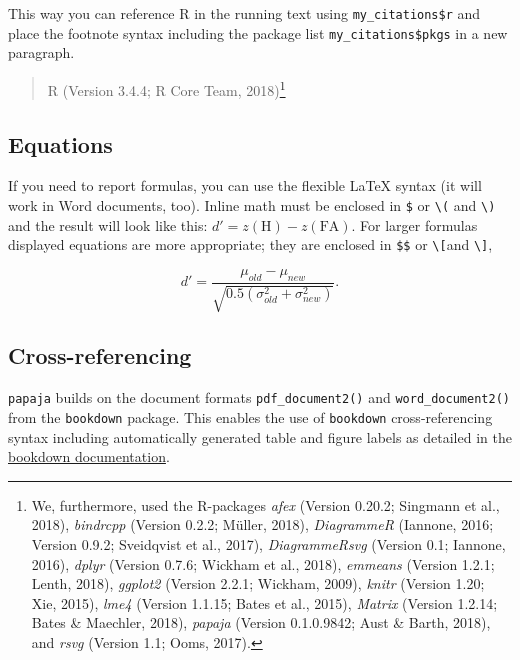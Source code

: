 \documentclass[man,floatsintext]{apa6}
\let\rmarkdownfootnote\footnote%
\def\footnote{\protect\rmarkdownfootnote}
\theoremstyle{definition}
\theoremstyle{definition}
\theoremstyle{definition}
\theoremstyle{remark}
\begin{document}
This way you can reference R in the running text using
\texttt{my\_citations\$r} and place the footnote syntax including the
package list \texttt{my\_citations\$pkgs} in a new paragraph.

\begin{quote}
R (Version 3.4.4; R Core Team, 2018)\footnote{We, furthermore, used the
  R-packages \emph{afex} (Version 0.20.2; Singmann et al., 2018),
  \emph{bindrcpp} (Version 0.2.2; Müller, 2018), \emph{DiagrammeR}
  (Iannone, 2016; Version 0.9.2; Sveidqvist et al., 2017),
  \emph{DiagrammeRsvg} (Version 0.1; Iannone, 2016), \emph{dplyr}
  (Version 0.7.6; Wickham et al., 2018), \emph{emmeans} (Version 1.2.1;
  Lenth, 2018), \emph{ggplot2} (Version 2.2.1; Wickham, 2009),
  \emph{knitr} (Version 1.20; Xie, 2015), \emph{lme4} (Version 1.1.15;
  Bates et al., 2015), \emph{Matrix} (Version 1.2.14; Bates \& Maechler,
  2018), \emph{papaja} (Version 0.1.0.9842; Aust \& Barth, 2018), and
  \emph{rsvg} (Version 1.1; Ooms, 2017).}
\end{quote}

\hypertarget{equations}{\subsection{Equations}\label{equations}}

If you need to report formulas, you can use the flexible LaTeX syntax
(it will work in Word documents, too). Inline math must be enclosed in
\texttt{\$} or \texttt{\textbackslash{}(} and \texttt{\textbackslash{})}
and the result will look like this:
\(d' = z(\mathrm{H}) - z(\mathrm{FA})\). For larger formulas displayed
equations are more appropriate; they are enclosed in \texttt{\$\$} or
\texttt{\textbackslash{}{[}}and \texttt{\textbackslash{}{]}},

\[
d' = \frac{\mu_{old} - \mu_{new}}{\sqrt{0.5(\sigma^2_{old} + \sigma^2_{new})}}.
\]

\hypertarget{cross-referencing}{\subsection{Cross-referencing}\label{cross-referencing}}

\texttt{papaja} builds on the document formats \texttt{pdf\_document2()}
and \texttt{word\_document2()} from the \texttt{bookdown} package. This
enables the use of \texttt{bookdown} cross-referencing syntax including
automatically generated table and figure labels as detailed in the
\href{https://bookdown.org/yihui/bookdown/cross-references.html}{bookdown
documentation}.
\end{document}
